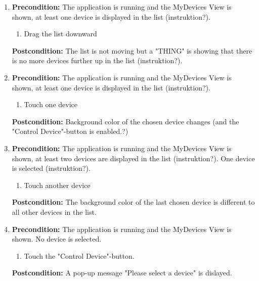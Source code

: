 \documentclass[a4paper]{article}
\newlength{\testlabellength}
\newenvironment{testlist}{\begin{enumerate}[label=\bfseries Instruction \thesubsection.\arabic* , labelindent=0pt, labelwidth=\testlabellength , leftmargin=2cm]}{\end{enumerate}}
\begin{document}
\begin{appendices}
\begin{testlist}
    \item \vspace{5mm} \textbf{Precondition:} The application is running and the MyDevices View is shown, at least one device is displayed in the list (instruktion?).
    			\begin{enumerate}
                	\item Drag the list downward
                \end{enumerate}
                \textbf{Postcondition:} The list is not moving but a "THING" is showing that there is no more devices further up in the list (instruktion?).
    
    \item \vspace{5mm} \textbf{Precondition:} The application is running and the MyDevices View is shown, at least one device is displayed in the list (instruktion?).
    			\begin{enumerate}
                	\item Touch one device
                \end{enumerate}
                \textbf{Postcondition:} Background color of the chosen device changes (and the "Control Device"-button is enabled.?)  
   
   \item \vspace{5mm} \textbf{Precondition:} The application is running and the MyDevices View is shown, at least two devices are displayed in the list (instruktion?). One device is selected (instruktion?).
    			\begin{enumerate}
                    \item Touch another device
                \end{enumerate}
                \textbf{Postcondition:} The background color of the last chosen device is different to all other devices in the list.
   
   \item \vspace{5mm} \textbf{Precondition:} The application is running and the MyDevices View is shown. No device is selected.
    			\begin{enumerate}
                    \item Touch the "Control Device"-button.
                \end{enumerate}
                \textbf{Postcondition:} A pop-up message "Please select a device" is dislayed.
   

\end{testlist}
\end{appendices}
\end{document}
